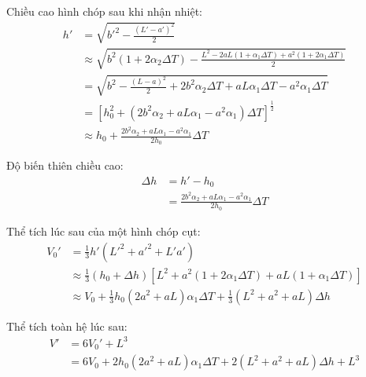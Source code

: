 \begin{enumerate}[label=(\alph*)]
Chiều cao hình chóp sau khi nhận nhiệt:
\begin{equation}
\begin{aligned}
  h' &= \sqrt{{b'}^2 - \frac{(L'-a')^2}{2}} \\
  &\approx \sqrt{b^2(1+ 2\alpha_2 \Delta T) - \frac{L^2-2aL(1+\alpha_1\Delta T)+a^2(1+ 2\alpha_1 \Delta T)}{2}} \\
  &= \sqrt{b^2-\frac{(L-a)^2}{2}+2b^2 \alpha_2 \Delta T+aL \alpha_1 \Delta T-a^2\alpha_1 \Delta T} \\
  &= \left[ h_0^2+\left(2b^2 \alpha_2 +aL \alpha_1 -a^2\alpha_1\right) \Delta T \right]^\frac{1}{2}\\ 
  &\approx h_0+\frac{2b^2\alpha_2+aL\alpha_1-a^2\alpha_1}{2h_0}\Delta T
\end{aligned}
\end{equation}

Độ biến thiên chiều cao:
\begin{equation}
\begin{aligned}
  \Delta h &= h'-h_0\\ 
  &=\frac{2b^2\alpha_2+aL\alpha_1-a^2\alpha_1}{2h_0}\Delta T
\end{aligned}
\end{equation}

Thể tích lúc sau của một hình chóp cụt:
\begin{equation}
\begin{aligned}
  V_0'&=\frac{1}{3}h' \left( {L'}^2 + {a'}^2 + L'a' \right) \\
  &\approx \frac{1}{3}\left(h_0 + \Delta h\right)\left[L^2 + a^2(1+ 2\alpha_1 \Delta T) + aL(1+\alpha_1\Delta T)\right] \\
  &\approx V_0 + \frac{1}{3}h_0(2a^2+aL)\alpha_1\Delta T + \frac{1}{3}(L^2+a^2+aL)\Delta h
\end{aligned}
\end{equation}

Thể tích toàn hệ lúc sau:
\begin{equation}
\begin{aligned}
  V'&=6V_0'+L^3 \\
  &=6V_0+2h_0(2a^2+aL)\alpha_1\Delta T + 2(L^2+a^2+aL)\Delta h +L^3
\end{aligned}
\end{equation}


\end{enumerate}

